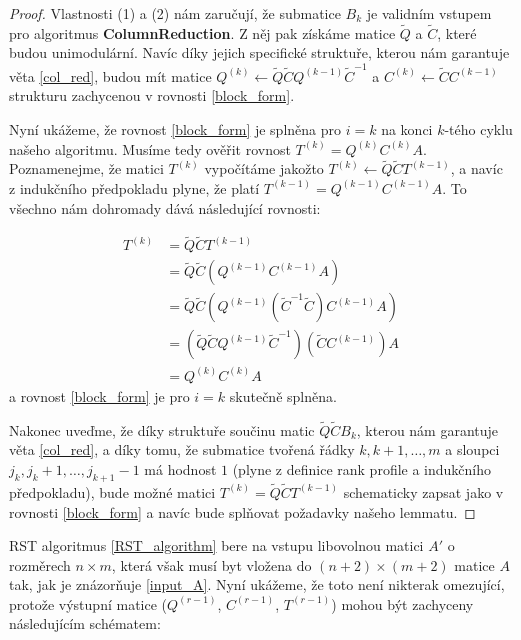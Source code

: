 \begin{proof}
Vlastnosti (1) a (2) nám zaručují, že submatice $ B_k $ je validním vstupem pro
algoritmus \textbf{ColumnReduction}. Z něj pak získáme matice $ \tilde{Q} $ a
$ \tilde{C} $, které budou unimodulární. Navíc díky jejich specifické struktuře,
kterou nám garantuje věta \ref{col_red}, budou mít matice
$ { Q^{(k)} \leftarrow \tilde{Q} \tilde{C} Q^{(k - 1)} \tilde{C}^{-1} } $ a
$ { C^{(k)} \leftarrow \tilde{C} C^{(k - 1)} } $
strukturu zachycenou v rovnosti \ref{block_form}.

Nyní ukážeme, že rovnost \ref{block_form} je splněna pro $ i = k $
na konci $ k $-tého cyklu našeho algoritmu. Musíme tedy ověřit rovnost
$ T^{(k)} = Q^{(k)} C^{(k)} A $. Poznamenejme, že matici $ T^{(k)} $ vypočítáme
jakožto $ T^{(k)} \leftarrow \tilde{Q} \tilde{C} T^{(k - 1)} $, a navíc
z indukčního předpokladu plyne, že platí $ T^{(k - 1)} = Q^{(k - 1)} C^{(k - 1)} A $.
To všechno nám dohromady dává následující rovnosti:

\begin{align*}
    T^{(k)} &= \tilde{Q} \tilde{C} T^{(k - 1)} \\
            &= \tilde{Q} \tilde{C} (Q^{(k - 1)} C^{(k - 1)} A) \\
            &= \tilde{Q} \tilde{C} (Q^{(k - 1)} (\tilde{C}^{-1} \tilde{C}) C^{(k - 1)} A) \\
            &= (\tilde{Q} \tilde{C} Q^{(k - 1)} \tilde{C}^{-1}) (\tilde{C} C^{(k - 1)}) A \\
            &= Q^{(k)} C^{(k)} A
\end{align*}
a rovnost \ref{block_form} je pro $ i = k $ skutečně splněna.

Nakonec uveďme, že díky struktuře součinu matic $ \tilde{Q} \tilde{C} B_k $, kterou
nám garantuje věta \ref{col_red}, a díky tomu, že submatice tvořená řádky
$ k, k+1, \dots, m $ a sloupci $ j_k, j_k + 1, \dots, j_{k+1} - 1 $ má hodnost
$ 1 $ (plyne z definice rank profile a indukčního předpokladu), bude možné matici
$ T^{(k)} = \tilde{Q} \tilde{C} T^{(k - 1)} $ schematicky zapsat jako v rovnosti
\ref{block_form} a navíc bude splňovat požadavky našeho lemmatu.
\end{proof}

RST algoritmus \ref{RST_algorithm} bere na vstupu libovolnou matici $ A' $ o
rozměrech $ n \times m $, která však musí byt vložena do $ (n + 2) \times (m + 2) $
matice $ A $ tak, jak je znázorňuje \ref{input_A}. Nyní ukážeme, že toto není
nikterak omezující, protože výstupní matice
($ Q^{(r - 1)} $, $ C^{(r - 1)} $, $ T^{(r - 1)} $) mohou být zachyceny
následujícím schématem:

